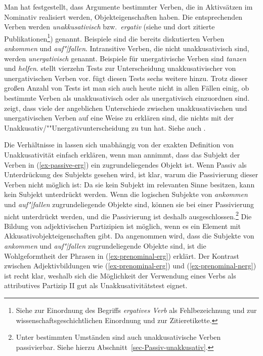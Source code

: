 \noindent
Man hat festgestellt, dass Argumente bestimmter Verben, die in Aktivsätzen im Nominativ realisiert
werden, Objekteigenschaften haben. Die entsprechenden Verben werden \emph{unakkusativisch}
\citep{Perlmutter78} bzw.\ \emph{ergativ} (siehe \zb \cites[30]{Burzio81a-u}[2]{Grewendorf89a} und dort
zitierte Publikationen\footnote{
  Siehe \citet{Pullum88a} zur Einordnung des Begriffs \emph{ergatives Verb} als Fehlbezeichnung und
  zur wissenschaftsgeschichtlichen Einordnung und zur Zitieretikette.
}) genannt. Beispiele sind die bereits diskutierten Verben
\emph{ankommen} und \emph{auf"|fallen}. Intransitive Verben, die nicht unakkusativisch sind, werden
\emph{unergativisch} genannt. Beispiele für unergativische Verben sind
\emph{tanzen} und \emph{helfen}. \citet{Grewendorf89a} stellt
vierzehn Tests zur Unterscheidung unakkusativischer von unergativischen Verben vor.
\citet{Fanselow92} fügt diesen Tests sechs weitere hinzu.  Trotz dieser großen Anzahl
von Tests ist man sich auch heute nicht in allen Fällen einig, ob bestimmte Verben als
unakkusativisch oder als unergativisch einzuordnen sind.
\citet{Kaufmann95a}
zeigt, dass viele der angeblichen Unterschiede zwischen unakkusativischen und unergativischen Verben
auf eine Weise zu erklären sind, die nichts mit der Unakkusativ/""Unergativunterscheidung zu tun
hat. Siehe auch .

Die Verhältnisse in  lassen sich unabhängig von
der exakten Definition von Unakkusativität einfach erklären, wenn man annimmt,
dass das Subjekt der Verben in (\ref{ex-passive-erg}) ein zugrundeliegendes Objekt ist.
Wenn Passiv als Unterdrückung des Subjekts gesehen wird, ist klar, warum die Passivierung dieser
Verben nicht möglich ist: Da sie kein Subjekt im relevanten Sinne besitzen, kann kein Subjekt
unterdrückt werden. Wenn die logischen Subjekte von \emph{ankommen} und \emph{auf"|fallen}
zugrundeliegende Objekte sind, können sie bei einer Passivierung nicht unterdrückt werden,
und die Passivierung ist deshalb ausgeschlossen.\footnote{
        Unter bestimmten Umständen sind auch unakkusativische Verben
        passivierbar. Siehe hierzu Abschnitt~\ref{sec-Passiv-unakkusativ}.
}
Die Bildung von adjektivischen Partizipien ist möglich, wenn es ein Element mit
Akkusativobjekteigenschaften gibt. Da angenommen wird, dass die Subjekte
von \emph{ankommen} und \emph{auf"|fallen} zugrundeliegende Objekte sind,
ist die Wohlgeformtheit der Phrasen in (\ref{ex-prenominal-erg}) erklärt. Der Kontrast zwischen
Adjektivbildungen wie (\ref{ex-prenominal-erg}) und (\ref{ex-prenominal-nerg}) ist recht klar,
weshalb sich die Möglichkeit der Verwendung eines Verbs als attributives Partizip II gut als
Unakkusativitätstest eignet.%



